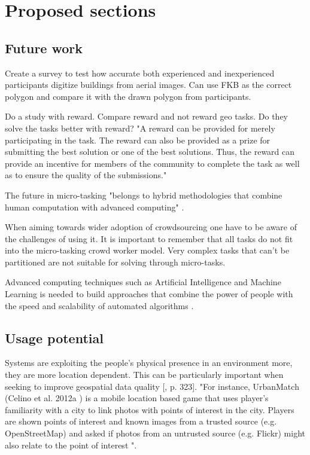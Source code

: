 \chapter{Proposed sections}

\section{Future work}

Create a survey to test how accurate both experienced and inexperienced participants digitize buildings from aerial images. Can use FKB as the correct polygon and compare it with the drawn polygon from participants. 

Do a study with reward. Compare reward and not reward geo tasks. Do they solve the tasks better with reward? "A reward can be provided for merely participating in the task. The reward can also be provided as a prize for submitting the best solution or one of the best solutions. Thus, the reward can provide an incentive for members of the community to complete the task as well as to ensure the quality of the submissions."  %

The future in micro-tasking "belongs to hybrid methodologies that combine human computation with advanced computing" \citep{Meier2013}. 

When aiming towards wider adoption of crowdsourcing one have to be aware of the challenges of using it. It is important to remember that all tasks do not fit into the micro-tasking crowd worker model. Very complex tasks that can't be partitioned are not suitable for solving through micro-tasks. 

Advanced computing techniques such as Artificial Intelligence and Machine Learning is needed to build approaches that combine the power of people with the speed and scalability of automated algorithms \citep{Meier2013}. 

\section{Usage potential}
Systems are exploiting the people's physical presence in an environment more, they are more location dependent. This can be particularly important when seeking to improve geospatial data quality [\citep{Meier2013}, p. 323]. "For instance, UrbanMatch (Celino et al. 2012a ) is a mobile location based game that uses player’s familiarity with a city to link photos with points of interest in the city. Players are shown points of interest and known images from a trusted source (e.g. OpenStreetMap) and asked if photos from an untrusted source (e.g. Flickr) might also relate to the point of interest ".  

